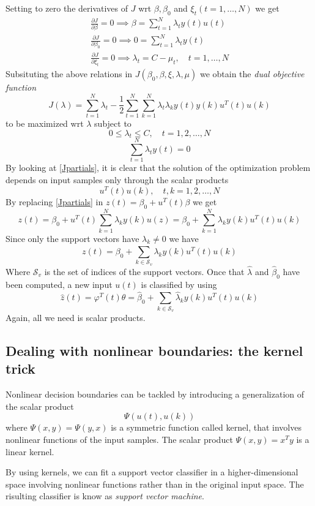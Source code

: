 \documentclass{book}
\theoremstyle{definition}
\theoremstyle{remark}
\theoremstyle{remark}
\begin{document}
Setting to zero the derivatives of $J$ wrt $\beta,\beta_0$ and $\xi_t(t=1,\dots,N)$ we get 
\begin{gather} \label{Jpartials}
  \displaystyle\frac{\partial J}{\partial \beta}= 0 \implies \beta=\displaystyle\sum_{t=1}^{N}\lambda_ty(t)u(t)\\
  \displaystyle\frac{\partial J}{\partial \beta_0}= 0 \implies 0=\displaystyle\sum_{t=1}^{N}\lambda_ty(t)\\
  \displaystyle\frac{\partial J}{\partial \xi_t}= 0 \implies \lambda_t=C-\mu_t, \quad t=1,\dots,N
\end{gather}
Subsituting the above relations in $J(\beta_0,\beta,\xi,\lambda,\mu)$ we obtain the \emph{dual objective function}
\[
  J(\lambda)=\displaystyle\sum_{t=1}^{N}\lambda_t-\displaystyle\frac{1}{2}\displaystyle\sum_{t=1}^{N}\displaystyle\sum_{k=1}^{N}\lambda_t\lambda_ky(t)y(k)u^T(t)u(k)
\]
to be maximized wrt $\lambda$ subject to 
\[
  0\leq \lambda_t \leq C, \quad t=1,2,\dots,N
\]
\[
  \displaystyle\sum_{t=1}^{N}\lambda_ty(t)=0
\]
By looking at \ref{Jpartials}, it is clear that the solution of the optimization problem depends on input samples only through the scalar products 
\[
  u^T(t)u(k), \quad t,k=1,2,\dots,N
\]
By replacing \ref{Jpartials} in $z(t)=\beta_0+u^T(t)\beta$ we get 
\[
  z(t) = \beta_0+u^T(t)\displaystyle\sum_{k=1}^{N}\lambda_ky(k)u(z)=\beta_0+\displaystyle\sum_{k=1}^{N}\lambda_ky(k)u^T(t)u(k)
\]
Since only the support vectors have $\lambda_k\neq 0$ we have 
\[
  z(t)=\beta_0+\displaystyle\sum_{k\in\mathcal{S}_v}^{}\lambda_ky(k)u^T(t)u(k)
\]
Where $\mathcal{S}_v$ is the set of indices of the support vectors. Once that $\hat{\lambda}$ and $\hat{\beta}_0$ have been computed, a new input $u(t)$ is classified by using 
\[
  \hat{z}(t)=\varphi^T(t)\hat{\theta}=\hat{\beta}_0+\displaystyle\sum_{k\in\mathcal{S}_v}^{}\hat{\lambda}_ky(k)u^T(t)u(k)
\]
Again, all we need is scalar products. 
\subsection{Dealing with nonlinear boundaries: the kernel trick}
Nonlinear decision boundaries can be tackled by introducing a generalization of the scalar product 
\[
  \Psi(u(t),u(k))
\]
where $\Psi(x,y)=\Psi(y,x)$ is a symmetric function called kernel, that involves nonlinear functions of the input samples. The scalar product $\Psi(x,y)=x^Ty$ is a linear kernel. 

By using kernels, we can fit a support vector classifier in a higher-dimensional space involving nonlinear functions rather than in the original input space. The risulting classifier is know as \emph{support vector machine}.
\end{document}
